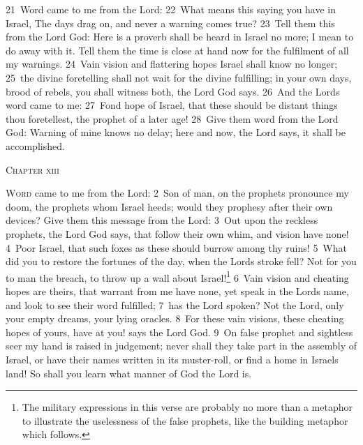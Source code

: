 \documentclass[10pt]{book} %
\begin{document}
\textcolor{benred8}{21}~Word came to me from the Lord: \textcolor{benred8}{22}~What means this saying you have in Israel, The days drag on, and never a warning comes true? \textcolor{benred8}{23}~Tell them this from the Lord God: Here is a proverb shall be heard in Israel no more; I mean to do away with it. Tell them the time is close at hand now for the fulfilment of all my warnings. \textcolor{benred8}{24}~Vain vision and flattering hopes Israel shall know no longer; \textcolor{benred8}{25}~the divine foretelling shall not wait for the divine fulfilling; in your own days, brood of rebels, you shall witness both, the Lord God says. \textcolor{benred8}{26}~And the Lord\textquotesingle s word came to me: \textcolor{benred8}{27}~Fond hope of Israel, that these should be distant things thou foretellest, the prophet of a later age! \textcolor{benred8}{28}~Give them word from the Lord God: Warning of mine knows no delay; here and now, the Lord says, it shall be accomplished.
\begin{large}\begin{center}\textsc{Chapter xiii}\end{center}\end{large}
\lettrine[lines=2]{W}{ord} came to me from the Lord: \textcolor{benred8}{2}~Son of man, on the prophets pronounce my doom, the prophets whom Israel heeds; would they prophesy after their own devices? Give them this message from the Lord: \textcolor{benred8}{3}~Out upon the reckless prophets, the Lord God says, that follow their own whim, and vision have none! \textcolor{benred8}{4}~Poor Israel, that such foxes as these should burrow among thy ruins! \textcolor{benred8}{5}~What did you to restore the fortunes of the day, when the Lord\textquotesingle s stroke fell? Not for you to man the breach, to throw up a wall about Israel!\footnote[1]{The military expressions in this verse are probably no more than a metaphor to illustrate the uselessness of the false prophets, like the building metaphor which follows.} \textcolor{benred8}{6}~Vain vision and cheating hopes are theirs, that warrant from me have none, yet speak in the Lord\textquotesingle s name, and look to see their word fulfilled; \textcolor{benred8}{7}~has the Lord spoken? Not the Lord, only your empty dreams, your lying oracles. \textcolor{benred8}{8}~For these vain visions, these cheating hopes of yours, have at you! says the Lord God. \textcolor{benred8}{9}~On false prophet and sightless seer my hand is raised in judgement; never shall they take part in the assembly of Israel, or have their names written in its muster-roll, or find a home in Israel\textquotesingle s land! So shall you learn what manner of God the Lord is.
\end{document}
